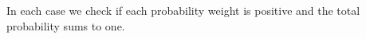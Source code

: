 \begin{ESolution}{2.1}
			In each case we check if each probability weight is positive and
			the total probability sums to one.
		
\end{ESolution}
